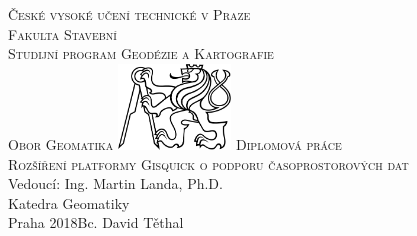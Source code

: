 \begin{center}
\newcommand{\napisCVUT}{České vysoké učení technické v Praze}
\newcommand{\napisFS}{Fakulta Stavební}
\newcommand{\napisProgram}{Studijní program Geodézie a Kartografie}
\newcommand{\napisObor}{Obor Geomatika}
\newcommand{\napisKatedra}{Katedra Geomatiky}
\newcommand{\napisVedouci}{Vedoucí: Ing. Martin Landa, Ph.D.}
\newcommand{\napisAutor}{Bc. David Těthal}
\newcommand{\napisDatum}{Praha 2018}
\newcommand{\napisNazevI}{Rozšíření platformy Gisquick o podporu časoprostorových dat}
\newcommand{\napisDiplomka}{Diplomová práce}
%
\newcommand{\velka}[1]{\textsc{#1}}
%
% 
\newif\ifpatitul
\patitultrue


{\Large\velka{\napisCVUT}}\\
{\Large\velka{\napisFS}}\\
{\Large\velka{\napisProgram}}\\
{\Large\velka{\napisObor}}
\vfill
\includegraphics[width=3cm]{./img/logo_cvut_cb} %
\vfill
{\Large\velka{\napisDiplomka}}\\
\Large\velka{\napisNazevI}\\
\vfill
{\large%
\napisVedouci\\
\napisKatedra\\
\bigskip
\napisDatum\hfill\napisAutor}
\end{center}
